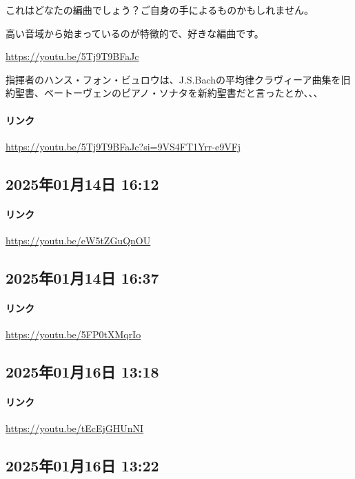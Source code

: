 これはどなたの編曲でしょう？ご自身の手によるものかもしれません。

高い音域から始まっているのが特徴的で、好きな編曲です。

\url{https://youtu.be/5Tj9T9BFaJc}

指揮者のハンス・フォン・ビュロウは、J.S.Bachの平均律クラヴィーア曲集を旧約聖書、ベートーヴェンのピアノ・ソナタを新約聖書だと言ったとか、、、

\paragraph{リンク}
\url{https://youtu.be/5Tj9T9BFaJc?si=9VS4FT1Yrr-e9VFj}

\subsection*{2025年01月14日 16:12}

\paragraph{リンク}
\url{https://youtu.be/eW5tZGuQnOU}

\subsection*{2025年01月14日 16:37}

\paragraph{リンク}
\url{https://youtu.be/5FP0tXMqrIo}

\subsection*{2025年01月16日 13:18}

\paragraph{リンク}
\url{https://youtu.be/tEcEjGHUnNI}

\subsection*{2025年01月16日 13:22}

